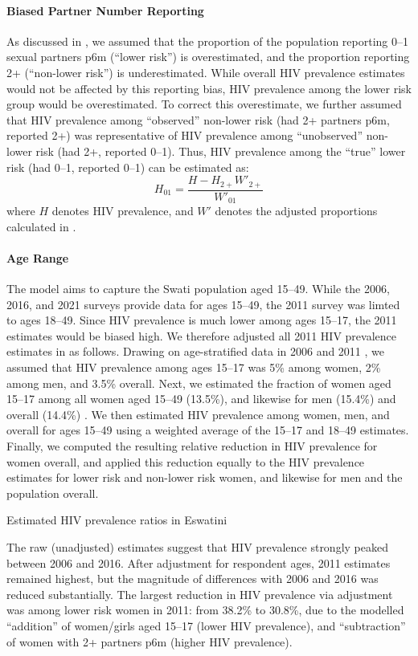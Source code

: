 \paragraph{Biased Partner Number Reporting}
As discussed in , we assumed that
the proportion of the population reporting 0--1 sexual partners p6m
(``lower risk'') is overestimated,
and the proportion reporting 2+ (``non-lower risk'') is underestimated.
While overall HIV prevalence estimates would not be affected by this reporting bias,
HIV prevalence among the lower risk group would be overestimated.
To correct this overestimate, we further assumed that
HIV prevalence among ``observed'' non-lower risk (had 2+ partners p6m, reported 2+)
was representative of HIV prevalence among ``unobserved'' non-lower risk (had 2+, reported 0--1).
Thus, HIV prevalence among the ``true'' lower risk (had 0--1, reported 0--1) can be estimated as:
\begin{equation}
  H_{01} = \frac{H - H_{2+}W'_{2+}}{W'_{01}}
\end{equation}
where $H$ denotes HIV prevalence,
and $W'$ denotes the adjusted proportions calculated in .
\paragraph{Age Range}
The model aims to capture the Swati population aged 15--49.
While the 2006, 2016, and 2021 surveys provide data for ages 15--49,
the 2011 survey was limted to ages 18--49.
Since HIV prevalence is much lower among ages 15--17,
the 2011 estimates would be biased high.
We therefore adjusted all 2011 HIV prevalence estimates in as follows.
Drawing on age-stratified data in 2006 \cite{SDHS2006} and 2011 \cite{Bicego2013},
we assumed that HIV prevalence among ages 15--17 was
5\% among women, 2\% among men, and 3.5\% overall.
Next, we estimated the fraction of women aged 15--17 among all women aged 15--49 (13.5\%),
and likewise for men (15.4\%) and overall (14.4\%) \cite{DataBank}.
We then estimated HIV prevalence among women, men, and overall for ages 15--49
using a weighted average of the 15--17 and 18--49 estimates.
Finally, we computed the resulting relative reduction in HIV prevalence for women overall,
and applied this reduction equally to the HIV prevalence estimates for
lower risk and non-lower risk women, and likewise for men and the population overall.
\begin{table}
  \centering
  \caption{Estimated HIV prevalence ratios in Eswatini}
  \label{tab:targ.pr}
  
\end{table}
\par
The raw (unadjusted) estimates suggest that HIV prevalence strongly peaked between 2006 and 2016.
After adjustment for respondent ages, 2011 estimates remained highest,
but the magnitude of differences with 2006 and 2016 was reduced substantially.
The largest reduction in HIV prevalence via adjustment
was among lower risk women in 2011: from 38.2\% to 30.8\%, due to the modelled
``addition'' of women/girls aged 15--17 (lower HIV prevalence), and
``subtraction'' of women with 2+ partners p6m (higher HIV prevalence).
